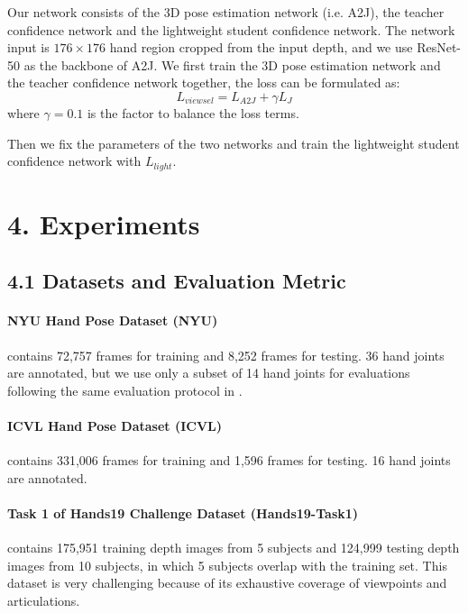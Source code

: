 \documentclass[letterpaper]{article} \usepackage{aaai22}  \usepackage{times}  \usepackage{helvet}  \usepackage{courier}  \usepackage[hyphens]{url}  \usepackage{graphicx} \urlstyle{rm} \def\UrlFont{\rm}  \usepackage{natbib}  \usepackage{caption} \DeclareCaptionStyle{ruled}{labelfont=normalfont,labelsep=colon,strut=off} \frenchspacing  \setlength{\pdfpagewidth}{8.5in}  \setlength{\pdfpageheight}{11in}  \usepackage{algorithm}
\begin{document}
Our network consists of the 3D pose estimation network (i.e. A2J), the teacher confidence network and the lightweight student confidence network. 
The network input is $176 \times 176$ hand region cropped from the input depth, and we use ResNet-50 as the backbone of A2J.
We first train the 3D pose estimation network and the teacher confidence network together, the loss can be formulated as:
\begin{equation}
\label{eq:final_loss}
L_{\textit{viewsel}} = L_{\textit{A2J}} + \gamma L_J
\end{equation}
where $\gamma = 0.1$ is the factor to balance the loss terms.

Then we fix the parameters of the two networks and train the lightweight student confidence network with $L_{light}$.

\section{4. Experiments}
\subsection{4.1 Datasets and Evaluation Metric}
\paragraph{NYU Hand Pose Dataset (NYU)} \cite{tompson2014real} contains 72,757 frames for training and 8,252 frames for testing. 36 hand joints are annotated,  but we use only a subset of 14 hand joints for evaluations following the same evaluation protocol in \cite{tompson2014real}.

\paragraph{ICVL Hand Pose Dataset (ICVL)} \cite{tang2014latent} contains 331,006 frames for training and 1,596 frames for testing. 16 hand joints are annotated.

\paragraph{Task 1 of Hands19 Challenge Dataset (Hands19-Task1)} \cite{armagan2020measuring} contains 175,951 training depth images from 5 subjects and 124,999 testing depth images from 10  subjects, in which 5 subjects overlap with the training set. This dataset is very challenging because of its exhaustive coverage of viewpoints and articulations.
\end{document}
